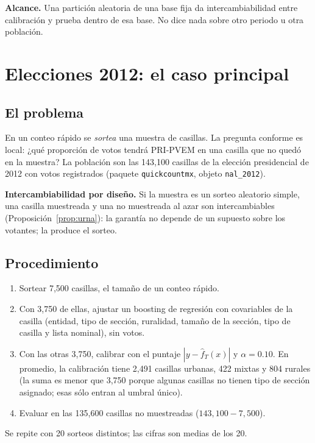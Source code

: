 \documentclass[11pt]{article}
\theoremstyle{plain}
\theoremstyle{definition}
\theoremstyle{remark}
\newcommand{\fhat}{\widehat f_T}
\newcommand{\dest}[1]{\par\needspace{4\baselineskip}\textbf{#1}\quad}
\newcommand{\lamina}[1]{}%
\begin{document}
\dest{Alcance.} Una partición aleatoria de una base fija da intercambiabilidad entre calibración y
prueba dentro de esa base. No dice nada sobre otro periodo u otra población.

\section{Elecciones 2012: el caso principal}\label{sec:conteo2012}\lamina{24--27}
\subsection{El problema}
En un conteo rápido se \emph{sortea} una muestra de casillas. La pregunta conforme es local: ¿qué
proporción de votos tendrá PRI-PVEM en una casilla que no quedó en la muestra? La población son las
143,100 casillas de la elección presidencial de 2012 con votos registrados (paquete
\texttt{quickcountmx}, objeto \texttt{nal\_2012}).

\dest{Intercambiabilidad por diseño.} Si la muestra es un sorteo aleatorio simple, una casilla
muestreada y una no muestreada al azar son intercambiables (Proposición~\ref{prop:urna}): la garantía
no depende de un supuesto sobre los votantes; la produce el sorteo.

\subsection{Procedimiento}
\begin{enumerate}
\item Sortear 7,500 casillas, el tamaño de un conteo rápido.
\item Con 3,750 de ellas, ajustar un boosting de regresión con covariables de la casilla (entidad,
tipo de sección, ruralidad, tamaño de la sección, tipo de casilla y lista nominal), sin votos.
\item Con las otras 3,750, calibrar con el puntaje $|y-\fhat(x)|$ y $\alpha=0.10$. En promedio, la
calibración tiene 2,491 casillas urbanas, 422 mixtas y 804 rurales (la suma es menor que 3,750
porque algunas casillas no tienen tipo de sección asignado; esas sólo entran al umbral único).
\item Evaluar en las 135,600 casillas no muestreadas ($143{,}100-7{,}500$).
\end{enumerate}
Se repite con 20 sorteos distintos; las cifras son medias de los 20.
\end{document}
